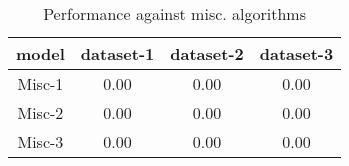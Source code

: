 
\begin{table*}[!b]
\renewcommand{\arraystretch}{1.25}
\caption{Performance against misc. algorithms}
\label{table:results:misc-comparisons}
\begin{tabular}{|c|c|c|c|}
\hline
\textbf{model} & \textbf{dataset-1} & \textbf{dataset-2} & \textbf{dataset-3} \\
\hline
Misc-1 & 0.00 & 0.00 & 0.00 \\
\hline
Misc-2 & 0.00 & 0.00 & 0.00 \\
\hline
Misc-3 & 0.00 & 0.00 & 0.00 \\
\hline
\end{tabular}
\end{table*}






